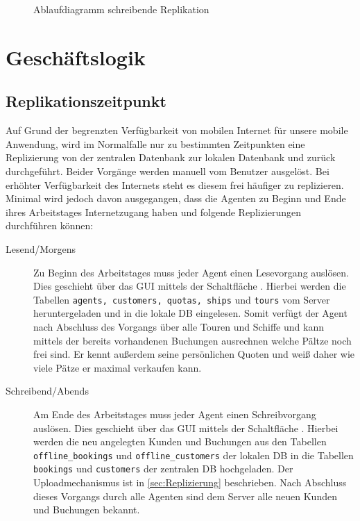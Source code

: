 \documentclass[12pt,a4paper,ngerman,english]{report}
\begin{document}
\begin{figure}[h]
  \centering
  
  \caption{Ablaufdiagramm schreibende Replikation}
  \label{fig:ReplSchreibend}
\end{figure}

\chapter{Geschäftslogik}

\section{Replikationszeitpunkt}
\label{sec:RepliZeit}

Auf Grund der begrenzten Verfügbarkeit von mobilen Internet für unsere mobile Anwendung, wird im Normalfalle nur zu bestimmten Zeitpunkten eine Replizierung von der zentralen Datenbank zur lokalen Datenbank und zurück durchgeführt. Beider Vorgänge werden manuell vom Benutzer ausgelöst. Bei erhöhter Verfügbarkeit des Internets steht es diesem frei häufiger zu replizieren. Minimal wird jedoch davon ausgegangen, dass die Agenten zu Beginn und Ende ihres Arbeitstages Internetzugang haben und folgende Replizierungen durchführen können:

\begin{description}
\item[Lesend/Morgens] Zu Beginn des Arbeitstages muss jeder Agent einen Lesevorgang auslösen. Dies geschieht über das GUI mittels der Schaltfläche . Hierbei werden die Tabellen \texttt{agents, customers, quotas, ships} und \texttt{tours} vom Server heruntergeladen und in die lokale DB eingelesen. Somit verfügt der Agent nach Abschluss des Vorgangs über alle Touren und Schiffe und kann mittels der bereits vorhandenen Buchungen ausrechnen welche Pältze noch frei sind. Er kennt außerdem seine persönlichen Quoten und weiß daher wie viele Pätze er maximal verkaufen kann.
\item[Schreibend/Abends] Am Ende des Arbeitstages muss jeder Agent einen Schreibvorgang auslösen. Dies geschieht über das GUI mittels der Schaltfläche . Hierbei werden die neu angelegten Kunden und Buchungen aus den Tabellen \texttt{offline\_bookings} und \texttt{offline\_customers} der lokalen DB in die Tabellen \texttt{bookings} und \texttt{customers} der zentralen DB hochgeladen. Der Uploadmechanismus ist in \autoref{sec:Replizierung} beschrieben. Nach Abschluss dieses Vorgangs durch alle Agenten sind dem Server alle neuen Kunden und Buchungen bekannt. 
\end{description}
\end{document}
